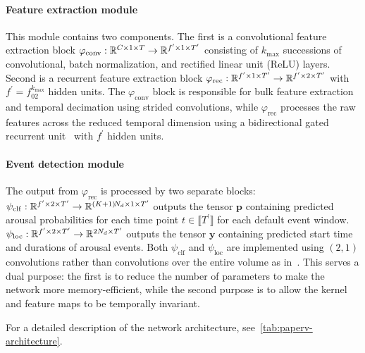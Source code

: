 \paragraph{Feature extraction module}
This module contains two components. 
The first is a convolutional feature extraction block $\varphi_{\mathrm{conv}} : \mathbb{R}^{C \times 1 \times T} \to \mathbb{R}^{f^{\prime} \times 1 \times T^{\prime}}$ consisting of $k_{\mathrm{max}}$ successions of convolutional, batch normalization, and rectified linear unit (ReLU) layers.
Second is a recurrent feature extraction block $\varphi_{\mathrm{rec}} : \mathbb{R}^{f^{\prime} \times 1 \times T^{\prime}} \to \mathbb{R}^{f^{\prime} \times 2 \times T^{\prime}}$ with $f^{\prime}=f_02^{k_{\mathrm{max}}}$ hidden units.
The $\varphi_{\mathrm{conv}}$ block is responsible for bulk feature extraction and temporal decimation using strided convolutions, while $\varphi_{\mathrm{rec}}$ processes the raw features across the reduced temporal dimension using a bidirectional gated recurrent unit~\cite{Cho2014} with $f^{\prime}$ hidden units.
\paragraph{Event detection module}
The output from $\varphi_{\mathrm{rec}}$ is processed by two separate blocks: $ \psi_{\mathrm{clf}} : \mathbb{R}^{f^{\prime} \times 2 \times T^{\prime}} \to \mathbb{R}^{\left( K + 1 \right) \! N_d \times 1 \times T^{\prime}} $ outputs the tensor $\mathbf{p}$ containing predicted arousal probabilities for each time point $t \in \llbracket T^{\prime} \rrbracket$ for each default event window. 
$ \psi_{\mathrm{loc}} : \mathbb{R}^{f^{\prime} \times 2 \times T^{\prime}} \to \mathbb{R}^{2N_d \times T^{\prime}} $ outputs the tensor $\mathbf{y}$ containing predicted start time and durations of arousal events. 
Both $\psi_{\mathrm{clf}}$ and $\psi_{\mathrm{loc}}$ are implemented using $\left(2, 1\right)$ convolutions rather than convolutions over the entire volume as in~\cite{Chambon2018b, Chambon2019, Olesen2019}.
This serves a dual purpose: the first is to reduce the number of parameters to make the network more memory-efficient, while the second purpose is to allow the kernel and feature maps to be temporally invariant.

For a detailed description of the network architecture, see~\cref{tab:paperv-architecture}.

